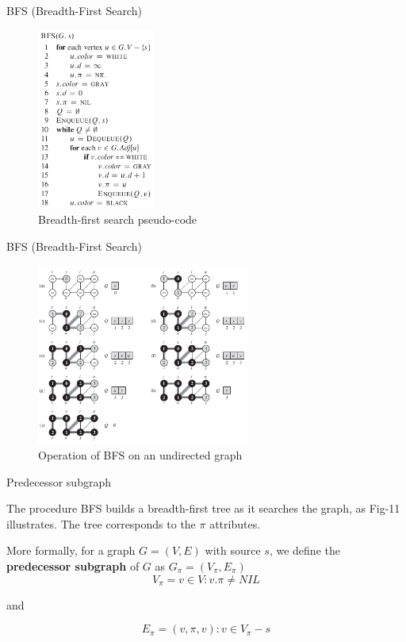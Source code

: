 \documentclass[ignorenonframetext,]{beamer}
\begin{document}
\begin{frame}{BFS (Breadth-First Search)}
\protect\hypertarget{bfs-breadth-first-search-1}{}

\begin{figure}
\centering
\includegraphics[width=\textwidth,height=2.34375in]{breadth-first-search-pseudocode.png}
\caption{Breadth-first search pseudo-code}
\end{figure}

\end{frame}

\begin{frame}{BFS (Breadth-First Search)}
\protect\hypertarget{bfs-breadth-first-search-2}{}

\begin{figure}
\centering
\includegraphics[width=\textwidth,height=2.34375in]{bfs-undirected-graph.png}
\caption{Operation of BFS on an undirected graph}
\end{figure}

\end{frame}

\begin{frame}{Predecessor subgraph}
\protect\hypertarget{predecessor-subgraph}{}

The procedure BFS builds a breadth-ﬁrst tree as it searches the graph,
as Fig-11 illustrates. The tree corresponds to the \(\pi\) attributes.

More formally, for a graph \(G = (V, E)\) with source \(s\), we deﬁne
the \textbf{predecessor subgraph} of \(G\) as
\(G_{\pi} = (V_{\pi}, E_{\pi})\) \[
V_{\pi} = { v \in V : v.\pi \ne NIL }
\]

and

\[
E_{\pi} = { (v, \pi, v) : v \in V_{\pi} - {s} }
\]

\end{frame}
\end{document}
